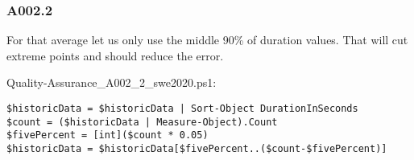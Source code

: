 \hypertarget{a002.2}{%
\subsubsection{A002.2}}

For that average let us only use the middle 90\% of duration values.
That will cut extreme points and should reduce the error.

Quality-Assurance\_A002\_2\_swe2020.ps1:

\begin{verbatim}
$historicData = $historicData | Sort-Object DurationInSeconds
$count = ($historicData | Measure-Object).Count
$fivePercent = [int]($count * 0.05)
$historicData = $historicData[$fivePercent..($count-$fivePercent)]
\end{verbatim}

